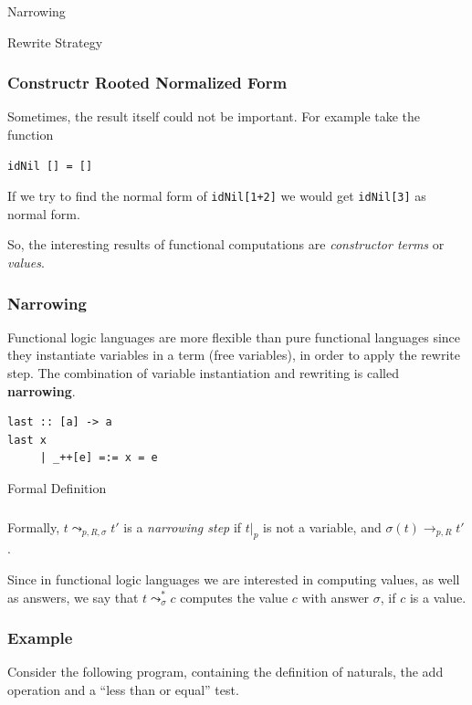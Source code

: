 \documentclass{beamer}
\begin{document}
\begin{section}{Narrowing}
\begin{subsection}{Rewrite Strategy}
\begin{frame}[fragile]

\frametitle{Constructr Rooted Normalized Form}
Sometimes, the result itself could not be important. For example take the function

\begin{example}
\begin{verbatim}
idNil [] = []
\end{verbatim}
\end{example}
If we try to find the normal form of \verb|idNil[1+2]| we would get \verb|idNil[3]| as normal form.

So, the interesting results of functional computations are \textit{constructor terms} or \textit{values}.
\end{frame}

\begin{frame}
[fragile]

\frametitle{Narrowing}

Functional logic languages are more flexible than pure functional languages since they instantiate variables in a term (free variables), in order to apply the rewrite step. The combination of variable instantiation and rewriting is called \textbf{narrowing}.
\begin{example}
\begin{verbatim}
last :: [a] -> a
last x
     | _++[e] =:= x = e
\end{verbatim}
\end{example}
\end{frame}

\end{subsection}

\begin{subsection}{Formal Definition}
\begin{frame}
\frametitle{\subsecname}
  Formally, $t \leadsto _{p,R,\sigma} t'$ is a \textit{narrowing step} if $t|_p$ is not a variable, and $\sigma(t) \rightarrow_{p,R} t'$.


\bigskip
 Since in functional logic languages we are interested in computing values, as well as answers, we say that $t \leadsto ^ * _ \sigma c$ computes the value $c$ with answer $\sigma$, if $c$ is a value.
  \end{frame}
\end{subsection}

  
\begin{frame}
[fragile]

\frametitle{Example}
  Consider the following program, containing the definition of naturals, the add operation and a ``less than or equal'' test.


\end{frame}
\end{section}
\end{document}
